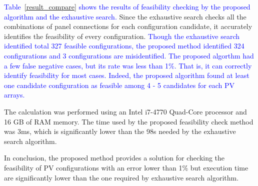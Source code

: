 \documentclass[conference]{pvsctran}
\newcommand{\michiko}{\textcolor{blue}}
\begin{document}
\michiko{Table~\ref{result_compare} shows the results of feasibility checking by the proposed algorithm and the exhaustive search.} 
Since the exhaustive search checks all the combinations of panel connections for each configuration candidate, it accurately identifies the feasibility of every configuration. %
\michiko{Though the exhaustive search identified total 327 feasible configurations, the proposed method identified 324 configurations and 3 configurations are misidentified. 
The proposed algorthm had a few false negative cases, but its rate was less than 1\%.
That is, it can correctly identify feasibility for most cases. 
Indeed, the proposed algorithm found at least one candidate configuration as feasible among 4 - 5 candidates for each PV arrays. }

The calculation was performed using an Intel i7-4770 Quad-Core processor and 16 GB of RAM memory.
The time used by the proposed feasibility check method was 3ms, which is significantly lower than the 98s needed by the exhaustive search algorithm.

In conclusion, the proposed method provides a solution for checking the feasibility of PV configurations with an error lower than 1\% but execution time are significantly lower than the one required by exhaustive search algorithm.
\end{document}
